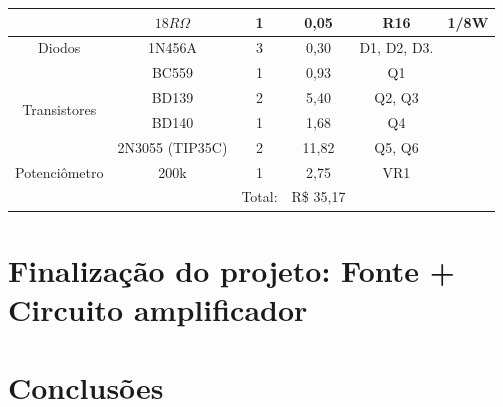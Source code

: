 \documentclass[a4paper,12pt,oneside,openany,table,xcdraw]{article}
\begin{document}
\begin{table}[H]
{\begin{tabular}{cc|c|c|cc}
\multicolumn{1}{|c|}{}                              & $18R \Omega$           & 1                   & 0,05           & \multicolumn{1}{c|}{R16}                & \multicolumn{1}{c|}{1/8W}                          \\ \hline
\multicolumn{1}{|c|}{Diodos}                        & 1N456A                 & 3                   & 0,30               & \multicolumn{1}{c|}{D1, D2, D3.}        & \multicolumn{1}{c|}{}                              \\ \hline
\multicolumn{1}{|c|}{\multirow{4}{*}{Transistores}} & BC559                  & 1                   & 0,93           & \multicolumn{1}{c|}{Q1}                 & \multicolumn{1}{c|}{}                              \\ \cline{2-6} 
\multicolumn{1}{|c|}{}                              & BD139                  & 2                   & 5,40           & \multicolumn{1}{c|}{Q2, Q3}             & \multicolumn{1}{c|}{}                              \\ \cline{2-6} 
\multicolumn{1}{|c|}{}                              & BD140                  & 1                   & 1,68           & \multicolumn{1}{c|}{Q4}                 & \multicolumn{1}{c|}{}                              \\ \cline{2-6} 
\multicolumn{1}{|c|}{}                              & 2N3055 (TIP35C)        & 2                   & 11,82           & \multicolumn{1}{c|}{Q5, Q6}             & \multicolumn{1}{c|}{}                              \\ \hline
\multicolumn{1}{|c|}{Potenciômetro}                 & 200k                   & 1                   &  2,75              & \multicolumn{1}{c|}{VR1}                & \multicolumn{1}{c|}{}                              \\ \hline
\multicolumn{1}{l}{}                                &                        & Total:              & R\$  35,17     &                                         &                                                    \\ \cline{3-4}
\end{tabular}%
}
\end{table}

\newpage
\section{Finalização do projeto: Fonte + Circuito amplificador}

\newpage
\section{Conclusões}
\end{document}

